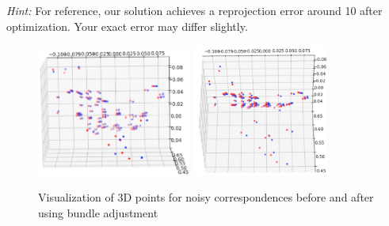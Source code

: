 \textit{Hint:} For reference, our solution achieves a reprojection error around 10 after optimization. Your exact error may differ slightly. 

\begin{your_solution}[title=Q5.3,height=5.5cm,width=\linewidth]
\end{your_solution}

\begin{figure}[h!]
    \centering
    \includegraphics[width=0.45\textwidth]{images/q5_3.png}
    \includegraphics[width=0.4\textwidth]{images/q5_3b.png}
\caption{Visualization of 3D points for noisy correspondences before and after using bundle
adjustment}
    \label{fig:q5}
\end{figure}